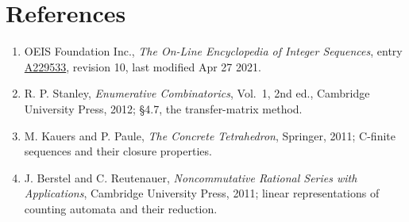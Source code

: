 \documentclass[11pt]{article}
\theoremstyle{definition}
\begin{document}
\section{References}

\begin{enumerate}

\item OEIS Foundation Inc., \emph{The On-Line Encyclopedia of Integer Sequences}, entry \href{https://oeis.org/A229533}{A229533}, revision 10, last modified Apr 27 2021.

\item R. P. Stanley, \emph{Enumerative Combinatorics}, Vol.~1, 2nd ed., Cambridge University Press, 2012; \S4.7, the transfer-matrix method.

\item M. Kauers and P. Paule, \emph{The Concrete Tetrahedron}, Springer, 2011; C-finite sequences and their closure properties.

\item J. Berstel and C. Reutenauer, \emph{Noncommutative Rational Series with Applications}, Cambridge University Press, 2011; linear representations of counting automata and their reduction.

\end{enumerate}
\end{document}
